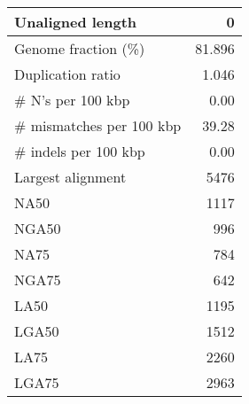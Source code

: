 \documentclass[12pt,a4paper]{article}
\begin{document}
\begin{table}[ht]
\begin{center}
\begin{tabular}{|l*{1}{|r}|}
Unaligned length & 0 \\ \hline
Genome fraction (\%) & 81.896 \\ \hline
Duplication ratio & 1.046 \\ \hline
\# N's per 100 kbp & 0.00 \\ \hline
\# mismatches per 100 kbp & 39.28 \\ \hline
\# indels per 100 kbp & 0.00 \\ \hline
Largest alignment & 5476 \\ \hline
NA50 & 1117 \\ \hline
NGA50 & 996 \\ \hline
NA75 & 784 \\ \hline
NGA75 & 642 \\ \hline
LA50 & 1195 \\ \hline
LGA50 & 1512 \\ \hline
LA75 & 2260 \\ \hline
LGA75 & 2963 \\ \hline
\end{tabular}
\end{center}
\end{table}
\end{document}
